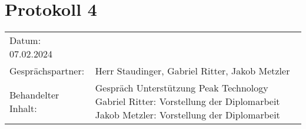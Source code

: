 \section*{Protokoll 4}

\begin{tabular}{p{} p{}}
	Datum: 07.02.2024 \\
	Gesprächspartner: & Herr Staudinger, Gabriel Ritter, Jakob Metzler \\
	Behandelter Inhalt: & Gespräch Unterstützung Peak Technology \newline
	Gabriel Ritter: Vorstellung der Diplomarbeit \newline
	Jakob Metzler: Vorstellung der Diplomarbeit \newline
\end{tabular}
